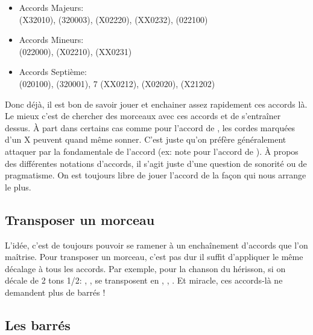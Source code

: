 \documentclass[versionenligne]{patacrep}
\begin{document}
\begin{itemize}
\item Accords Majeurs:\\  (X32010), 
  (320003),  (X02220),  (XX0232), 
  (022100)\\
\item Accords Mineurs:\\
   (022000),  (X02210),  (XX0231)\\
\item Accords Septième:\\  (020100), 
  (320001), 7 (XX0212),  (X02020),
   (X21202)\\
\end{itemize}

Donc déjà, il est bon de savoir jouer et enchainer assez rapidement
ces accords là. Le mieux c'est de chercher des morceaux avec ces
accords et de s'entraîner dessus.  À part dans certains cas comme pour
l'accord de , les cordes marquées d'un X peuvent quand
même sonner.  C'est juste qu'on préfère généralement attaquer par la
fondamentale de l'accord (ex: note  pour l'accord de
). À propos des différentes notations d'accords,
il s'agit juste d'une question de sonorité ou de pragmatisme. On est
toujours libre de jouer l'accord de la façon qui nous arrange le plus.

\subsection{Transposer un morceau}

L'idée, c'est de toujours pouvoir se ramener à un enchaînement
d'accords que l'on maîtrise.  Pour transposer un morceau, c'est pas
dur il suffit d'appliquer le même décalage à tous les accords.  Par
exemple, pour la chanson du hérisson, si on décale de 2 tons 1/2:
, ,  se transposent en
, , .  Et miracle, ces
accords-là ne demandent plus de barrés !

\subsection{Les barrés}
\end{document}
